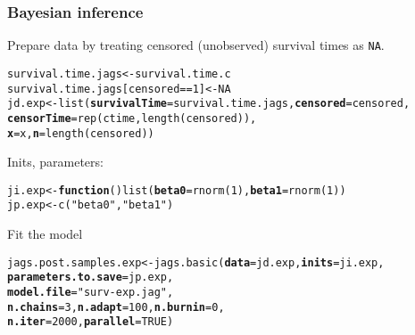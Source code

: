 \documentclass[color=usenames,dvipsnames]{beamer}\usepackage[]{graphicx}\usepackage[]{color}
\makeatletter
\newcommand{\hlnum}[1]{\textcolor[rgb]{0.69,0.494,0}{#1}}%
\newcommand{\hlstr}[1]{\textcolor[rgb]{0.749,0.012,0.012}{#1}}%
\newcommand{\hlopt}[1]{\textcolor[rgb]{0,0,0}{#1}}%
\newcommand{\hlstd}[1]{\textcolor[rgb]{0,0,0}{#1}}%
\newcommand{\hlkwa}[1]{\textcolor[rgb]{0,0,0}{\textbf{#1}}}%
\newcommand{\hlkwb}[1]{\textcolor[rgb]{0,0.341,0.682}{#1}}%
\newcommand{\hlkwc}[1]{\textcolor[rgb]{0,0,0}{\textbf{#1}}}%
\newcommand{\hlkwd}[1]{\textcolor[rgb]{0.004,0.004,0.506}{#1}}%
\newenvironment{kframe}{%
 \def\at@end@of@kframe{}%
 \ifinner\ifhmode%
  \def\at@end@of@kframe{\end{minipage}}%
  \begin{minipage}{\columnwidth}%
 \fi\fi%
 \def\FrameCommand##1{\hskip\@totalleftmargin \hskip-\fboxsep
 \colorbox{shadecolor}{##1}\hskip-\fboxsep
     \hskip-\linewidth \hskip-\@totalleftmargin \hskip\columnwidth}%
 \MakeFramed {\advance\hsize-\width
   \@totalleftmargin\z@ \linewidth\hsize
   \@setminipage}}%
 {\par\unskip\endMakeFramed%
 \at@end@of@kframe}
\newenvironment{knitrout}{}{} %
\newcommand{\inr}[1]{\colorbox{inlinecolor}{\texttt{#1}}}
\makeatother
\begin{document}
\begin{frame}[fragile]
  \frametitle{Bayesian inference}
  Prepare data by treating censored (unobserved) survival times as
  \inr{NA}. 
\begin{knitrout}\scriptsize
{}\color{fgcolor}\begin{kframe}
\begin{alltt}
\hlstd{survival.time.jags} \hlkwb{<-} \hlstd{survival.time.c}
\hlstd{survival.time.jags[censored}\hlopt{==}\hlnum{1}\hlstd{]} \hlkwb{<-} \hlnum{NA}
\hlstd{jd.exp} \hlkwb{<-} \hlkwd{list}\hlstd{(}\hlkwc{survivalTime}\hlstd{=survival.time.jags,} \hlkwc{censored}\hlstd{=censored,}
               \hlkwc{censorTime}\hlstd{=}\hlkwd{rep}\hlstd{(ctime,} \hlkwd{length}\hlstd{(censored)),}
               \hlkwc{x}\hlstd{=x,} \hlkwc{n}\hlstd{=}\hlkwd{length}\hlstd{(censored))}
\end{alltt}
\end{kframe}
\end{knitrout}
\pause
\vfill
  Inits, parameters:
\begin{knitrout}\scriptsize
{}\color{fgcolor}\begin{kframe}
\begin{alltt}
\hlstd{ji.exp} \hlkwb{<-} \hlkwa{function}\hlstd{()} \hlkwd{list}\hlstd{(}\hlkwc{beta0}\hlstd{=}\hlkwd{rnorm}\hlstd{(}\hlnum{1}\hlstd{),} \hlkwc{beta1}\hlstd{=}\hlkwd{rnorm}\hlstd{(}\hlnum{1}\hlstd{))}
\hlstd{jp.exp} \hlkwb{<-} \hlkwd{c}\hlstd{(}\hlstr{"beta0"}\hlstd{,} \hlstr{"beta1"}\hlstd{)}
\end{alltt}
\end{kframe}
\end{knitrout}
\pause
\vfill
  {\normalsize Fit the model}
\begin{knitrout}\scriptsize
{}\color{fgcolor}\begin{kframe}
\begin{alltt}
\hlstd{jags.post.samples.exp} \hlkwb{<-} \hlkwd{jags.basic}\hlstd{(}\hlkwc{data}\hlstd{=jd.exp,} \hlkwc{inits}\hlstd{=ji.exp,}
                                    \hlkwc{parameters.to.save}\hlstd{=jp.exp,}
                                    \hlkwc{model.file}\hlstd{=}\hlstr{"surv-exp.jag"}\hlstd{,}
                                    \hlkwc{n.chains}\hlstd{=}\hlnum{3}\hlstd{,} \hlkwc{n.adapt}\hlstd{=}\hlnum{100}\hlstd{,} \hlkwc{n.burnin}\hlstd{=}\hlnum{0}\hlstd{,}
                                    \hlkwc{n.iter}\hlstd{=}\hlnum{2000}\hlstd{,} \hlkwc{parallel}\hlstd{=}\hlnum{TRUE}\hlstd{)}
\end{alltt}
\end{kframe}
\end{knitrout}
\end{frame}
\end{document}

